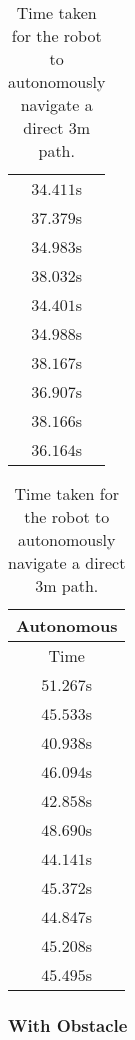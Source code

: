 \begin{appendices}
\begin{table}[!h]
\begin{tabular}{ c }
		$34.411$s \\

		$37.379$s \\

		$34.983$s \\

		$38.032$s \\

		$34.401$s \\

		$34.988$s \\

		$38.167$s \\

		$36.907$s \\

		$38.166$s \\

		\midrule
		$36.164$s \\
		\bottomrule
	\end{tabular}
	\hspace{2ex}
	\begin{tabular}{ c }
		\toprule
		\textbf{Autonomous} \\
		\midrule
		Time \\
		\midrule
		$51.267$s \\

		$45.533$s \\

		$40.938$s \\

		$46.094$s \\

		$42.858$s \\

		$48.690$s \\

		$44.141$s \\

		$45.372$s \\

		$44.847$s \\

		$45.208$s \\

		\midrule
		$45.495$s \\
		\bottomrule
	\end{tabular}
	\caption{Time taken for the robot to autonomously navigate a direct $3$m path.}
	\label{tab:eval_nav_dp_wo}
\end{table}

\subsubsection{With Obstacle}


\end{appendices}
